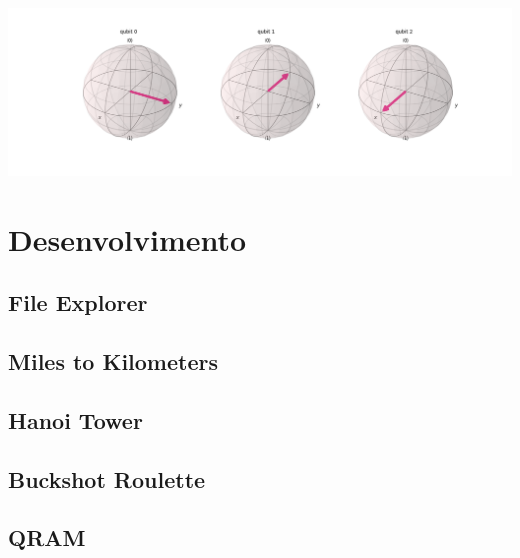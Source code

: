 \documentclass{article}
\begin{document}
\begin{center}
	\includegraphics[scale=0.3]{QFT_1_bloch.png}
	\label{fig:QFT-bloch}
\end{center}


\section{Desenvolvimento}
\subsection{File Explorer}
\subsection{Miles to Kilometers}
\subsection{Hanoi Tower}
\subsection{Buckshot Roulette}
\subsection{QRAM}

\begin{center}
\end{center}



\end{document}
